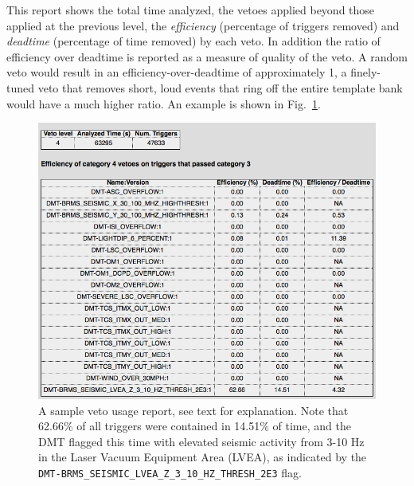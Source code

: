 
This report shows the total time analyzed, the vetoes applied beyond
those applied at the previous level, the \emph{efficiency} (percentage
of triggers removed) and \emph{deadtime} (percentage of time removed)
by each veto.  In addition the ratio of efficiency over deadtime is
reported as a measure of quality of the veto.  A random veto would
result in an efficiency-over-deadtime of approximately 1, a
finely-tuned veto that removes short, loud events that ring off the
entire template bank would have a much higher ratio.   An example is
shown in Fig.~\ref{f:daily_ihope_vetousage}.


\begin{figure}
  \includegraphics[width=\linewidth]{figures/detchar/vetousage.png}
  \caption[Sample veto usage report from Aug 19, 2010]{
  \label{f:daily_ihope_vetousage}
A sample veto usage report, see text for explanation.  Note that 62.66\% of
all triggers were contained in 14.51\% of time, and the DMT flagged this time
with elevated seismic activity from 3-10 Hz in the 
Laser Vacuum Equipment Area (LVEA), as indicated by the 
\texttt{DMT-BRMS\_SEISMIC\_LVEA\_Z\_3\_10\_HZ\_THRESH\_2E3} flag.}
\end{figure}%


